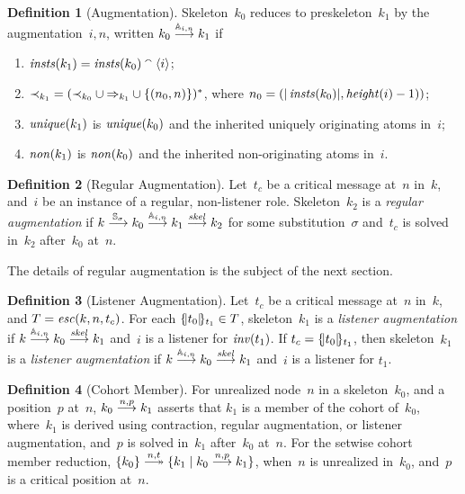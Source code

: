 \documentclass[12pt]{article}
\theoremstyle{definition}
\newtheorem{defn}{Definition}[section]
\begin{document}
\begin{defn}[Augmentation]\label{def:augmentation}
Skeleton~$k_0$ reduces to preskeleton~$k_1$ by the augmentation~$i,n$,
written $k_0\stackrel{\mathbb A_{i,n}}{\longrightarrow}k_1$ if
\begin{enumerate}
\item $\operatorname{\mathit{insts}}(k_1)=\operatorname{\mathit{insts}}(k_0)\mathbin{{}^\smallfrown}\langle i\rangle$;
\item $\mathbin{\prec_{k_1}}=(\mathord{\mathbin{\prec_{k_0}}}\cup\mathord{\Rightarrow_{k_1}}\cup
\mathord{\{(n_0, n)\}})^\ast$, where $n_0=(|\operatorname{\mathit{insts}}(k_0)|,
\operatorname{\mathit{height}}(i)-1))$;
\item $\operatorname{\mathit{unique}}(k_1)$ is $\operatorname{\mathit{unique}}(k_0)$ and the inherited
  uniquely originating atoms in~$i$;
\item $\operatorname{\mathit{non}}(k_1)$ is $\operatorname{\mathit{non}}(k_0)$ and the inherited
  non-originating atoms in~$i$.
\end{enumerate}
\end{defn}

\begin{defn}[Regular Augmentation]
Let~$t_c$ be a critical message at~$n$ in~$k$, and~$i$ be an instance
of a regular, non-listener role.  Skeleton~$k_2$ is a \emph{regular
  augmentation} if
$k\stackrel{\mathbb S_\sigma}{\longrightarrow}k_0\stackrel{\mathbb A_{i,n}}{\longrightarrow}k_1
\stackrel{\operatorname{\mathit{skel}}}{\longrightarrow}k_2$ for some substitution~$\sigma$ and~$t_c$ is
solved in~$k_2$ after~$k_0$ at~$n$.
\end{defn}

The details of regular augmentation is the subject of the next section.

\begin{defn}[Listener Augmentation]
Let~$t_c$ be a critical message at~$n$ in~$k$, and
$T=\operatorname{\mathit{esc}}(k,n,t_c)$.  For each $\{\!|t_0|\!\}_{t_1}\in T$,
skeleton~$k_1$ is a \emph{listener augmentation} if
$k\stackrel{\mathbb A_{i,n}}{\longrightarrow}k_0\stackrel{\operatorname{\mathit{skel}}}{\longrightarrow}k_1$ and~$i$ is a
listener for $\operatorname{\mathit{inv}}(t_1)$.  If $t_c=\{\!|t_0|\!\}_{t_1}$, then
skeleton~$k_1$ is a \emph{listener augmentation} if
$k\stackrel{\mathbb A_{i,n}}{\longrightarrow}k_0\stackrel{\operatorname{\mathit{skel}}}{\longrightarrow}k_1$ and~$i$ is a
listener for $t_1$.
\end{defn}

\begin{defn}[Cohort Member]
For unrealized node~$n$ in a skeleton~$k_0$, and a position~$p$ at~$n$, $k_0\stackrel{n,p}{\longrightarrow}k_1$ asserts that $k_1$ is a
member of the cohort of~$k_0$, where~$k_1$ is derived using
contraction, regular augmentation, or listener augmentation, and~$p$
is solved in~$k_1$ after~$k_0$ at~$n$.  For the setwise cohort member
reduction, $\{k_0\}\setreduction{n,t}\{k_1\mid k_0\reduction{n,p}k_1\}$,
when~$n$ is unrealized in~$k_0$, and~$p$ is a critical position at~$n$.
\end{defn}
\end{document}
